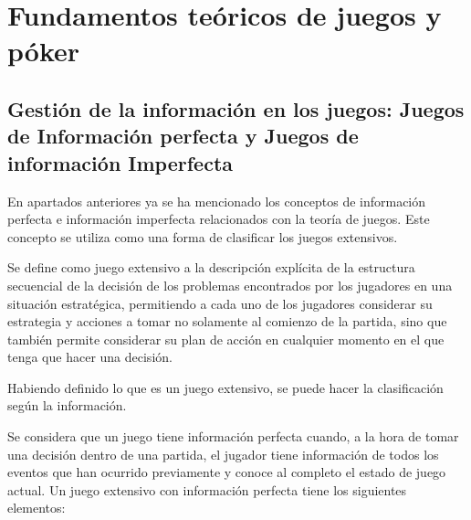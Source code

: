 \chapter{Fundamentos teóricos de juegos y póker}

\section{Gestión de la información en los juegos: Juegos de Información perfecta y Juegos de información Imperfecta}
\label{sec:info}

En apartados anteriores ya se ha mencionado los conceptos de información perfecta e información imperfecta relacionados con la teoría de juegos.\cite{Gametheory}
 Este concepto se utiliza como una forma de clasificar los juegos extensivos.

Se define como juego extensivo a la descripción explícita de la estructura secuencial de la decisión de los problemas encontrados por los jugadores en una situación estratégica, permitiendo a cada uno de los jugadores considerar su estrategia y acciones a tomar no solamente al comienzo de la partida, sino que también permite considerar su plan de acción en cualquier momento en el que tenga que hacer una decisión. \cite{Gametheory}

Habiendo definido lo que es un juego extensivo, se puede hacer la clasificación según la información. 

Se considera que un juego tiene información perfecta cuando, a la hora de tomar una decisión dentro de una partida, el jugador tiene información de todos los eventos que han ocurrido previamente y conoce al completo el estado de juego actual. Un juego extensivo con información perfecta tiene los siguientes elementos:

